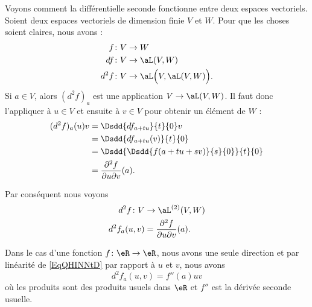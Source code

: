 \begin{example} \label{ExZHZYcNH}
	Voyons comment la différentielle seconde fonctionne entre deux espaces vectoriels. Soient deux espaces vectoriels de dimension finie \( V\) et \( W\). Pour que les choses soient claires, nous avons :
	\begin{subequations}
		\begin{align}
			f    & \colon V\to W                          \\
			df   & \colon V\to \aL(V,W)                   \\
			d^2f & \colon V\to \aL\Big( V,\aL(V,W) \Big).
		\end{align}
	\end{subequations}
	Si \( a\in V\), alors \( (d^2f)_a\) est une application \( V\to \aL(V,W)\). Il faut donc l'appliquer à \( u\in V\) et ensuite à \( v\in V\) pour obtenir un élément de \( W\) :
	\begin{subequations}
		\begin{align}
			(d^2f)_a(u)v & =\Dsdd{ df_{a+tu} }{t}{0}v                        \\
			             & =\Dsdd{ df_{a+tu}(v) }{t}{0}                      \\
			             & =\Dsdd{ \Dsdd{ f(a+tu+sv) }{s}{0} }{t}{0}         \\
			             & =\frac{ \partial^2f }{ \partial u\partial v }(a).
		\end{align}
	\end{subequations}


	Par conséquent nous voyons
	\begin{equation}\label{EqQHINNtD}
		\begin{aligned}
			d^2f\colon V & \to \aL^{(2)}(V,W)                                 \\
			d^2f_a(u,v)  & =\frac{ \partial^2f  }{ \partial u\partial v }(a).
		\end{aligned}
	\end{equation}

	Dans le cas d'une fonction \( f\colon \eR\to \eR\), nous avons une seule direction et par linéarité de \eqref{EqQHINNtD} par rapport à \( u\) et \( v\), nous avons
	\begin{equation}        \label{EQooSOCGooIiNGmG}
		d^2f_a(u,v)=f''(a)uv
	\end{equation}
	où les produits sont des produits usuels dans \( \eR\) et \( f''\) est la dérivée seconde usuelle.
\end{example}

